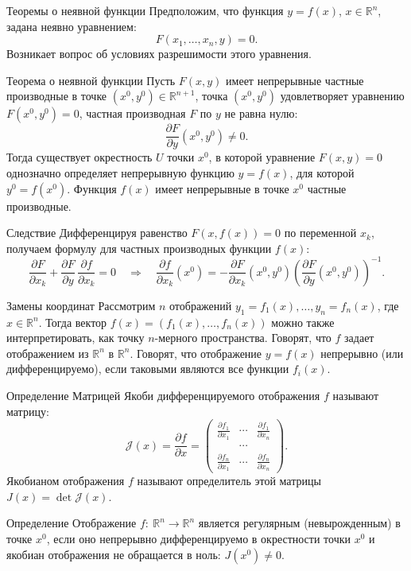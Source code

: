 \documentclass[8pt]{beamer}
\newcommand{\pp}[2]{\frac{\partial #1}{\partial #2}}
\begin{document}
\begin{frame}{Теоремы о неявной функции}
Предположим, что функция $y = f(x)$, $x\in\mathbb{R}^n$, задана неявно уравнением:
$$F(x_1,\ldots, x_n, y) = 0.$$
Возникает вопрос об условиях разрешимости этого уравнения.

\begin{block}{Теорема о неявной функции}
Пусть $F(x,y)$ имеет непрерывные частные производные в точке $(x^0,y^0)\in\mathbb{R}^{n+1}$, точка $(x^0,y^0)$ удовлетворяет уравнению $F(x^0,y^0)=0$, частная производная $F$ по $y$ не равна нулю:
$$\pp{F}{y}(x^0,y^0)\ne 0.$$
Тогда существует окрестность $U$ точки $x^0$, в которой уравнение $F(x,y)=0$ однозначно определяет непрерывную функцию $y = f(x)$, для которой $y^0=f(x^0)$. Функция $f(x)$ имеет непрерывные в точке $x^0$ частные производные.
\end{block}
\begin{block}{Следствие}
Дифференцируя равенство $F(x,f(x))=0$ по переменной $x_k$, получаем формулу для частных производных функции $f(x)$:
$$\pp{F}{x_k}+ \pp{F}{y}\, \pp{f}{x_k}= 0
\quad\Rightarrow\quad
\pp{f}{x_k}(x^0) = - \pp{F}{x_k}(x^0,y^0)\left( \pp{F}{y}(x^0, y^0) \right)^{-1}.$$
\end{block}
\end{frame}

\begin{frame}{Замены координат}
Рассмотрим $n$ отображений $y_1 = f_1(x),\ldots, y_n = f_n(x)$, где $x\in\mathbb{R}^n$. Тогда вектор $f(x) = (f_1(x),\ldots,f_n(x))$ можно также интерпретировать, как точку $n$-мерного пространства. Говорят, что $f$ задает отображением из $\mathbb{R}^n$ в $\mathbb{R}^n$. Говорят, что отображение $y=f(x)$ непрерывно (или дифференцируемо), если таковыми являются все функции $f_i(x)$.
\begin{block}{Определение}
Матрицей Якоби дифференцируемого отображения $f$ называют матрицу:
$$\mathcal{J}(x) = \pp{f}{x} =  \left(\begin{array}{cccc}
\pp{f_1}{x_1}&\cdots&\pp{f_1}{x_n}\\
& \cdots & \\
\pp{f_n}{x_1}&\cdots&\pp{f_n}{x_n}
\end{array}\right).$$
Якобианом отображения $f$ называют определитель этой матрицы  $J(x) = \det \mathcal{J}(x)$.
\end{block}
\begin{block}{Определение}
Отображение $f:\ \mathbb{R}^n\to\mathbb{R}^n$ является регулярным (невырожденным) в точке $x^0$, если оно непрерывно дифференцируемо в окрестности точки $x^0$ и якобиан отображения не обращается в ноль: $J(x^0)\ne0$.
\end{block}
\end{frame}
\end{document}
